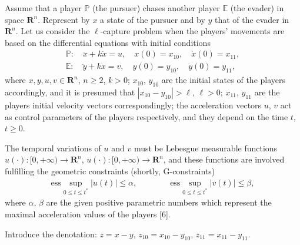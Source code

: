 \documentclass[12pt]{llncs}
\begin{document}
Assume that a player $\mathbb P$ (the pursuer) chases another player $\mathbb E$ (the evader) in space $\mathbf R^n$. Represent by $x$ a state of the pursuer and by $y$ that of the evader in $\mathbf R^n$. Let us consider the $\ell$-capture problem when the players' movements are based on the differential equations with initial conditions
\begin{gather*}
\mathbb{P}:\quad \ddot{x}+k\dot{x}=u,\quad x(0)=x_{10},\quad \dot{x}(0)=x_{11}, \\
\mathbb{E}:\quad \ddot{y}+k\dot{x}=v,\quad y(0)=y_{10},\quad \dot{y}(0)=y_{11},
\end{gather*}
where $x, y, u, v \in \mathbf{R}^n$, $n\geq2$, $k>0$; $x_{10}$, $y_{10}$ are the initial states of the players accordingly, and it is presumed that $|x_{10}-y_{10}|>\ell$, $\ell>0$; $x_{11}$, $y_{11}$ are the players initial velocity vectors correspondingly; the acceleration vectors $u$, $v$ act as control parameters of the players respectively, and they depend on the time $t$, $t\geq0$.

The temporal variations of $u$ and $v$ must be Lebesgue measurable functions $u(\cdot):[0,+\infty)\rightarrow\mathbf R^n$, $u(\cdot):[0,+\infty)\rightarrow\mathbf R^n$, and these functions are involved fulfilling the geometric constraints (shortly, G-constraints)\
\begin{gather*}
\mbox{ess}\sup_{0\leq t\leq t^*}|u(t)|\leq \alpha, \quad \quad \quad \quad
\mbox{ess}\sup_{0\leq t\leq t^*}|v(t)|\leq \beta,
\end{gather*}
where $\alpha$, $\beta$ are the given positive parametric numbers which represent the maximal acceleration values of the players [6].

Introduce the denotation: $z=x-y$, $z_{10}=x_{10}-y_{10}$, $z_{11}=x_{11}-y_{11}$.
\end{document}
